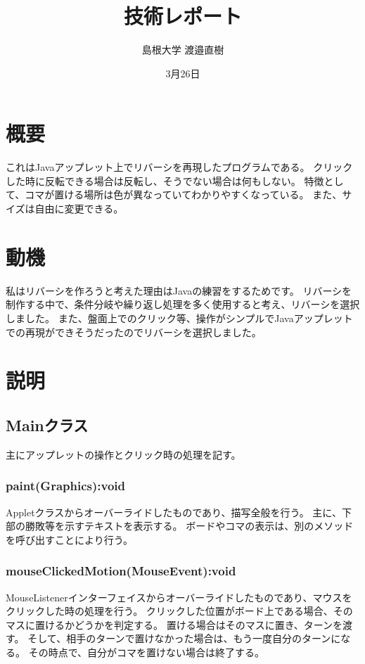 \documentclass[10.5pt, a4paper]{jsarticle}
\title{技術レポート}
\author{島根大学 渡邉直樹}
\date{3月26日}
\begin{document}
\maketitle

\section{概要}
これはJavaアップレット上でリバーシを再現したプログラムである。
クリックした時に反転できる場合は反転し、そうでない場合は何もしない。
特徴として、コマが置ける場所は色が異なっていてわかりやすくなっている。
また、サイズは自由に変更できる。

\section{動機}
私はリバーシを作ろうと考えた理由はJavaの練習をするためです。
リバーシを制作する中で、条件分岐や繰り返し処理を多く使用すると考え、リバーシを選択しました。
また、盤面上でのクリック等、操作がシンプルでJavaアップレットでの再現ができそうだったのでリバーシを選択しました。

\section{説明}
\subsection{Mainクラス}

主にアップレットの操作とクリック時の処理を記す。

\subsubsection*{paint(Graphics):void}

Appletクラスからオーバーライドしたものであり、描写全般を行う。
主に、下部の勝敗等を示すテキストを表示する。
ボードやコマの表示は、別のメソッドを呼び出すことにより行う。

\subsubsection* {mouseClickedMotion(MouseEvent):void}

MouseListenerインターフェイスからオーバーライドしたものであり、マウスをクリックした時の処理を行う。
クリックした位置がボード上である場合、そのマスに置けるかどうかを判定する。
置ける場合はそのマスに置き、ターンを渡す。
そして、相手のターンで置けなかった場合は、もう一度自分のターンになる。
その時点で、自分がコマを置けない場合は終了する。
\end{document}
